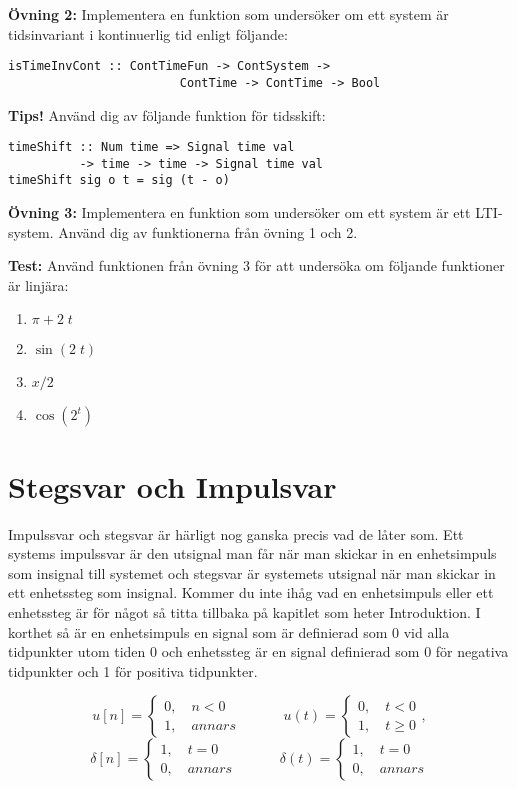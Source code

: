 \documentclass{article}
\begin{document}
\textbf{Övning 2:} Implementera en funktion som undersöker om ett system är tidsinvariant i kontinuerlig tid enligt följande:

\begin{verbatim}
isTimeInvCont :: ContTimeFun -> ContSystem -> 
                        ContTime -> ContTime -> Bool

\end{verbatim}

\textbf{Tips!} Använd dig av följande funktion för tidsskift:

\begin{verbatim}
timeShift :: Num time => Signal time val
          -> time -> time -> Signal time val
timeShift sig o t = sig (t - o)
\end{verbatim}

\textbf{Övning 3:} Implementera en funktion som undersöker om ett system är ett LTI-system. Använd dig av funktionerna från övning 1 och 2.

\textbf{Test:}
Använd funktionen från övning 3 för att undersöka om följande funktioner är linjära:
\begin{enumerate}
\item $\pi + 2\;t$
\item $\sin(2\;t)$
\item $x/2$
\item $\cos(2^t)$
\end{enumerate}

\section{Stegsvar och Impulsvar}

Impulssvar och stegsvar är härligt nog ganska precis vad de låter som. Ett
systems impulssvar är den utsignal man får när man skickar in en enhetsimpuls
som insignal till systemet och stegsvar är systemets utsignal när man skickar
in ett enhetssteg som insignal. Kommer du inte ihåg vad en enhetsimpuls eller
ett enhetssteg är för något så titta tillbaka på kapitlet som heter
Introduktion. I korthet så är en enhetsimpuls en signal som är definierad som
0 vid alla tidpunkter utom tiden 0 och enhetssteg är en signal definierad som
0 för negativa tidpunkter och 1 för positiva tidpunkter.

$$
u[n] = \begin{cases}
    0, \quad n < 0 \\
    1, \quad annars
        \end{cases}
\quad \quad \quad  
u(t) = 
    \begin{cases}
    0, \quad t < 0 \\
    1, \quad t \geq 0
    \end{cases},  
$$
$$
\delta[n] = 
    \begin{cases}
    1, \quad t = 0 \\
    0, \quad annars
    \end{cases}    
\quad \quad \quad  
\delta(t) =
    \begin{cases}
    1, \quad t = 0 \\
    0, \quad annars
    \end{cases}
$$
\end{document}
